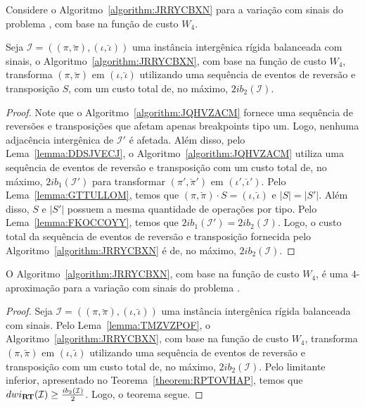 Considere o Algoritmo~\ref{algorithm:JRRYCBXN} para a variação com sinais do problema \SbWIRT{}, com base na função de custo $W_4$.



\begin{lemma}\label{lemma:TMZVZPOF}
Seja $\mathcal{I} = ((\pi,\breve\pi),(\iota,\breve\iota))$ uma instância intergênica rígida balanceada com sinais, o Algoritmo~\ref{algorithm:JRRYCBXN}, com base na função de custo $W_4$, transforma $(\pi,\breve\pi)$ em $(\iota,\breve\iota)$ utilizando uma sequência de eventos de reversão e transposição $S$, com um custo total de, no máximo, $2ib_2(\mathcal{I})$.
\end{lemma}
\begin{proof}
Note que o Algoritmo~\ref{algorithm:JQHVZACM} fornece uma sequência de reversões e transposições que afetam apenas breakpoints tipo um. Logo, nenhuma adjacência intergênica de $\mathcal{I'}$ é afetada. Além disso, pelo Lema~\ref{lemma:DDSJVECJ}, o Algoritmo~\ref{algorithm:JQHVZACM} utiliza uma sequência de eventos de reversão e transposição com um custo total de, no máximo, $2ib_1(\mathcal{I'})$ para transformar $(\pi',\breve\pi')$ em $(\iota',\breve\iota')$. Pelo Lema~\ref{lemma:GTTULLOM}, temos que $(\pi,\breve\pi) \cdot S = (\iota,\breve\iota)$ e $|S| = |S'|$. Além disso, $S$ e $|S'|$ possuem a mesma quantidade de operações por tipo. Pelo Lema~\ref{lemma:FKOCCOYY}, temos que $2ib_1(\mathcal{I'}) = 2ib_2(\mathcal{I})$. Logo, o custo total da sequência de eventos de reversão e transposição fornecida pelo Algoritmo~\ref{algorithm:JRRYCBXN} é de, no máximo, $2ib_2(\mathcal{I})$.
\end{proof}

\begin{theorem}\label{theorem:IUDGQWGI}
O Algoritmo~\ref{algorithm:JRRYCBXN}, com base na função de custo $W_4$, é uma $4$-aproximação para a variação com sinais do problema \SbWIRT{}.
\end{theorem}
\begin{proof}
Seja $\mathcal{I} = ((\pi,\breve\pi),(\iota,\breve\iota))$ uma instância intergênica rígida balanceada com sinais. Pelo Lema~\ref{lemma:TMZVZPOF}, o Algoritmo~\ref{algorithm:JRRYCBXN}, com base na função de custo $W_4$, transforma $(\pi,\breve\pi)$ em $(\iota,\breve\iota)$ utilizando uma sequência de eventos de reversão e transposição com um custo total de, no máximo, $2ib_2(\mathcal{I})$. Pelo limitante inferior, apresentado no Teorema~\ref{theorem:RPTOVHAP}, temos que $dwi_{\textbf{RT}}(\mathcal{I}) \ge \frac{ib_2(\mathcal{I})}{2}$. Logo, o teorema segue.
\end{proof}

